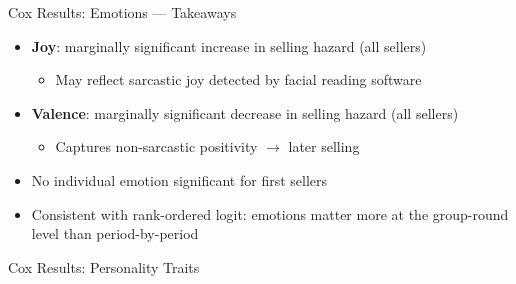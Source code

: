 \documentclass{beamer}
\begin{document}
\begin{frame}{Cox Results: Emotions --- Takeaways}
\begin{itemize}
    \item \textbf{Joy}: marginally significant increase in selling hazard (all sellers)
    \begin{itemize}
        \item May reflect sarcastic joy detected by facial reading software
    \end{itemize}
    \item \textbf{Valence}: marginally significant decrease in selling hazard (all sellers)
    \begin{itemize}
        \item Captures non-sarcastic positivity $\rightarrow$ later selling
    \end{itemize}
    \item No individual emotion significant for first sellers
    \item Consistent with rank-ordered logit: emotions matter more at the group-round level than period-by-period
\end{itemize}
\end{frame}


\begin{frame}{Cox Results: Personality Traits}
\begin{center}
\end{center}
\end{frame}
\end{document}
